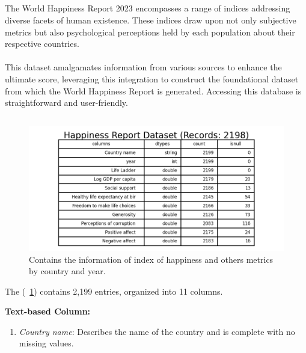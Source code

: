         \subsection{\duCollectInitialData}
            The World Happiness Report 2023 encompasses a range of indices addressing diverse facets of human existence. These indices draw upon not only subjective metrics but also psychological perceptions held by each population about their respective countries.
            \\
            \\
            This dataset amalgamates information from various sources to enhance the ultimate score, leveraging this integration to construct the foundational dataset from which the World Happiness Report is generated. Accessing this database is straightforward and user-friendly.

        \subsection{\duDescribeTheData}
            \begin{figure}[H]
                \centering
                \includegraphics[scale=1.3]{images/du_happiness_dataset}
                \caption{Contains the information of index of happiness and others metrics by country and year.}
                \label{fig:du-happiness-datasets}
            \end{figure}

            The \textit{\dsHappiness}(\figurename~\ref{fig:du-happiness-datasets}) contains 2,199 entries, organized into 11 columns.

            \textbf{Text-based Column:}
            \begin{enumerate}
                \item \textit{Country name}: Describes the name of the country and is complete with no missing values.
            \end{enumerate}

